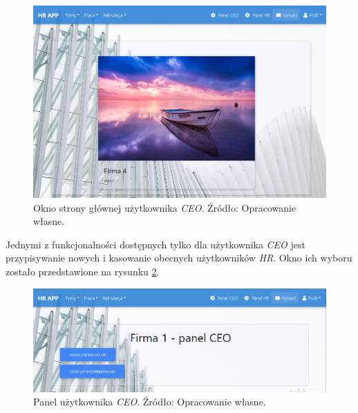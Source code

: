 \documentclass[twoside]{projektInzynierskiMS}
\numberwithin{figure}{section}
\begin{document}
\begin{figure}[h!]
    \centering
    \includegraphics[scale=0.6]{images/stronaGłównaCeo.png}
    \caption{Okno strony głównej użytkownika \textit{CEO}. Źródło: Opracowanie własne.}
    \label{fig:strona_główna_CEO}
\end{figure}

Jednymi z funkcjonalności dostępnych tylko dla użytkownika \textit{CEO} jest przypisywanie nowych i kasowanie obecnych użytkowników \textit{HR}. Okno ich wyboru zostało przedstawione na rysunku \ref{fig:panel_ceo}.

\begin{figure}[h!]
    \centering
    \includegraphics[width = \textwidth]{images/panelCeo.png}
    \caption{Panel użytkownika \textit{CEO}. Źródło: Opracowanie własne.}
    \label{fig:panel_ceo}
\end{figure}

\newpage
\end{document}

